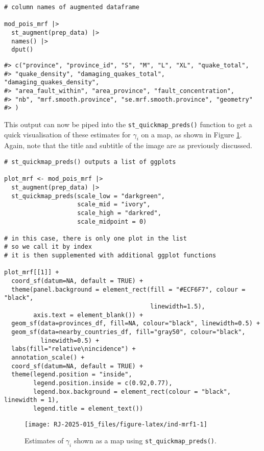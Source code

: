 \begin{verbatim}
# column names of augmented dataframe

mod_pois_mrf |>
  st_augment(prep_data) |>
  names() |>
  dput()
\end{verbatim}

\begin{verbatim}
#> c("province", "province_id", "S", "M", "L", "XL", "quake_total", 
#> "quake_density", "damaging_quakes_total", "damaging_quakes_density", 
#> "area_fault_within", "area_province", "fault_concentration", 
#> "nb", "mrf.smooth.province", "se.mrf.smooth.province", "geometry"
#> )
\end{verbatim}

This output can now be piped into the \texttt{st\_quickmap\_preds()} function to get a quick visualisation of
these estimates for \(\gamma_i\) on a map, as shown in Figure \ref{fig:ind-mrf1}. Again, note that the title and subtitle of the image are as previously discussed.



\begin{verbatim}
# st_quickmap_preds() outputs a list of ggplots

plot_mrf <- mod_pois_mrf |>
  st_augment(prep_data) |>
  st_quickmap_preds(scale_low = "darkgreen",
                    scale_mid = "ivory",
                    scale_high = "darkred",
                    scale_midpoint = 0)

# in this case, there is only one plot in the list
# so we call it by index
# it is then supplemented with additional ggplot functions

plot_mrf[[1]] +
  coord_sf(datum=NA, default = TRUE) +
  theme(panel.background = element_rect(fill = "#ECF6F7", colour = "black",
                                        linewidth=1.5),
        axis.text = element_blank()) +
  geom_sf(data=provinces_df, fill=NA, colour="black", linewidth=0.5) +
  geom_sf(data=nearby_countries_df, fill="gray50", colour="black",
          linewidth=0.5) +
  labs(fill="relative\nincidence") +
  annotation_scale() +
  coord_sf(datum=NA, default = TRUE) +
  theme(legend.position = "inside",
        legend.position.inside = c(0.92,0.77),
        legend.box.background = element_rect(colour = "black", linewidth = 1),
        legend.title = element_text())
\end{verbatim}

\begin{figure}

{\centering \texttt{[image: RJ-2025-015\_files/figure-latex/ind-mrf1-1]} 

}

\caption{Estimates of \(\gamma_i\) shown as a map using \texttt{st\_quickmap\_preds()}.}\label{fig:ind-mrf1}
\end{figure}

